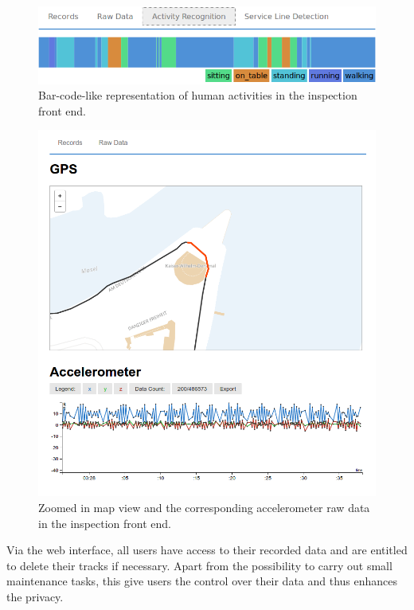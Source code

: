 \documentclass[times, 10pt,twocolumn]{article}
\begin{document}
\begin{figure}[h]
\includegraphics[width=\linewidth]{img/BarcodeScreenshot.png}
\caption{Bar-code-like representation of human activities in the inspection front end.}
\label{fig:inspectionBarcode}
\end{figure}
\begin{figure}[h]
\includegraphics[width=\linewidth]{img/InspectionTool_RAW.png}
\caption{Zoomed in map view and the corresponding accelerometer raw data in the inspection front end.}
\label{fig:inspectionRawData}
\end{figure}

Via the web interface, all users have access to their recorded data and are entitled to delete their tracks if necessary. Apart from the possibility to carry out small maintenance tasks, this give users the control over their data and thus enhances the privacy.
\end{document}
